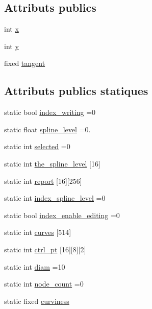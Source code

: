 \subsection*{Attributs publics}
\begin{DoxyCompactItemize}
\item 
int \hyperlink{classcurve__node_aa7ae8f2ee3bbd3e6194785c392751cdb}{x}
\item 
int \hyperlink{classcurve__node_afc1f4f007a920aa79c1f1f0ff0b49465}{y}
\item 
fixed \hyperlink{classcurve__node_a31ea7469070f7bb90ceae073d1d075a6}{tangent}
\end{DoxyCompactItemize}
\subsection*{Attributs publics statiques}
\begin{DoxyCompactItemize}
\item 
static bool \hyperlink{classcurve__node_ae995b9ef63ae5b880d6006083acaf6d3}{index\+\_\+writing} =0
\item 
static float \hyperlink{classcurve__node_a16c72a6637b3b68983b5ce55b90665bf}{spline\+\_\+level} =0.
\item 
static int \hyperlink{classcurve__node_abe017d998cde30d2ca5f7c8ea68ba3da}{selected} =0
\item 
static int \hyperlink{classcurve__node_a62eb9b6b3a24274664775a07c565d39c}{the\+\_\+spline\+\_\+level} \mbox{[}16\mbox{]}
\item 
static int \hyperlink{classcurve__node_a348cce4dfe54130e8b8b2fb218baedfb}{report} \mbox{[}16\mbox{]}\mbox{[}256\mbox{]}
\item 
static int \hyperlink{classcurve__node_af9c0c53bc02942259c36c753232326aa}{index\+\_\+spline\+\_\+level} =0
\item 
static bool \hyperlink{classcurve__node_a4479fff7bfc410d6f6d1df9975261aa8}{index\+\_\+enable\+\_\+editing} =0
\item 
static int \hyperlink{classcurve__node_a0aebfec8e10d7fc02442cd5326433c93}{curves} \mbox{[}514\mbox{]}
\item 
static int \hyperlink{classcurve__node_ab7280e17d47152797e10e5992791ee9b}{ctrl\+\_\+pt} \mbox{[}16\mbox{]}\mbox{[}8\mbox{]}\mbox{[}2\mbox{]}
\item 
static int \hyperlink{classcurve__node_aab45660e4c1077f8742b151fcb0cdcad}{diam} =10
\item 
static int \hyperlink{classcurve__node_a09d4ec4d9b46abddbcec3e0c46f53d3f}{node\+\_\+count} =0
\item 
static fixed \hyperlink{classcurve__node_a46e1f23c6d19a1ca915697c80ed72a84}{curviness}
\end{DoxyCompactItemize}
